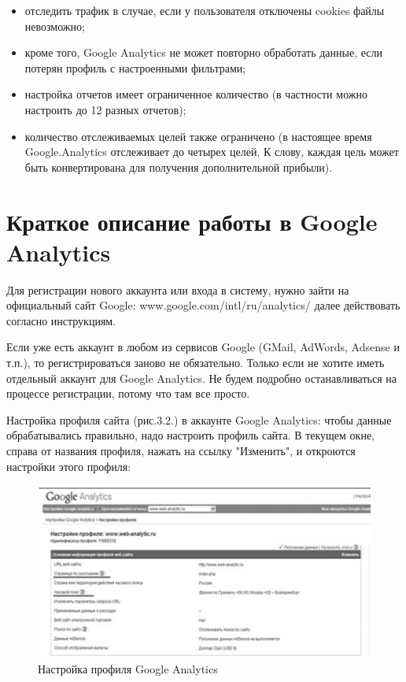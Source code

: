 \documentclass[a4paper,english,russian]{G2-105}
\begin{document}
\begin{itemize}
\item отследить трафик в случае, если у пользователя отключены cookies файлы невозможно;
\item кроме того, Google Analytics не может повторно обработать данные, если потерян профиль с настроенными фильтрами;
\item настройка отчетов имеет ограниченное количество (в частности можно настроить до 12 разных отчетов);
\item количество отслеживаемых целей также ограничено (в настоящее время Google.Analytics отслеживает до четырех целей. К слову, каждая цель может быть конвертирована для получения дополнительной прибыли).
\end{itemize}
\section{Краткое описание работы в Google Analytics}
\par Для регистрации нового аккаунта или входа в систему, нужно зайти на официальный сайт Google: www.google.com/intl/ru/analytics/ далее действовать согласно инструкциям.
\par Если уже есть аккаунт в любом из сервисов Google (GMail, AdWords, Adsense и т.п.), то регистрироваться заново не обязательно. Только если не хотите иметь отдельный аккаунт для Google Analytics. Не будем подробно останавливаться на процессе регистрации, потому что там все просто.
\par Настройка профиля сайта (рис.3.2.) в аккаунте Google Analytics: чтобы данные обрабатывались правильно, надо настроить профиль сайта. В текущем окне, справа от названия профиля, нажать на ссылку "Изменить", и откроются настройки этого профиля:
\begin{figure}
    \includegraphics[width=\linewidth]{ris2.png}
    \caption{Настройка профиля Google Analytics}
	\label{ris2}
\end{figure}
\end{document}
